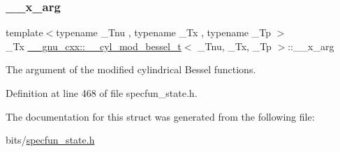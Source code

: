 \subsubsection{\texorpdfstring{\+\_\+\+\_\+x\+\_\+arg}{\_\_x\_arg}}
{\footnotesize\ttfamily template$<$typename \+\_\+\+Tnu , typename \+\_\+\+Tx , typename \+\_\+\+Tp $>$ \\
\+\_\+\+Tx \hyperlink{struct____gnu__cxx_1_1____cyl__mod__bessel__t}{\+\_\+\+\_\+gnu\+\_\+cxx\+::\+\_\+\+\_\+cyl\+\_\+mod\+\_\+bessel\+\_\+t}$<$ \+\_\+\+Tnu, \+\_\+\+Tx, \+\_\+\+Tp $>$\+::\+\_\+\+\_\+x\+\_\+arg}



The argument of the modified cylindrical Bessel functions. 



Definition at line 468 of file specfun\+\_\+state.\+h.



The documentation for this struct was generated from the following file\+:\begin{DoxyCompactItemize}
\item 
bits/\hyperlink{specfun__state_8h}{specfun\+\_\+state.\+h}\end{DoxyCompactItemize}
